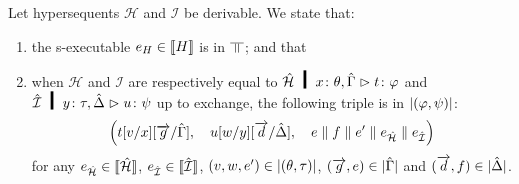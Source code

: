 \begin{theorem}[Adequacy]
 \label{c:adequacy}
 Let hypersequents $\mathcal H$ and $\mathcal I$ be derivable.
 We state that:
 \begin{enumerate}[label=(\arabic{*}), ref=\textit{(\arabic{*})}]
  \item \label{c:first} the s-executable
	$
	e_H\in\llbracket{H}\rrbracket
	$
	is in $\bbot$; and that
  \item \label{c:second}
	when $\mathcal H$ and $\mathcal I$ are respectively
	equal to $\hat{\mathcal H}\hmid\tj x\theta, \hat\G\tr \tj{t}\phi$
	and $\hat{\mathcal I}\hmid \tj y\tau, \hat\D\tr\tj u\psi$ up to
	exchange,
	the following triple is in $|{(\varphi,\psi)}|$:
	\[\left(
	t[v/x][\overrightarrow g/\hat {\Gamma}],\quad
	u[w/y][\overrightarrow d/\hat {\Delta}],\quad
	 e \parallel  f \parallel e' \parallel e_{\hat{\mathcal H}} \parallel
	e_{\hat{\mathcal I}}
	\right)
	\]
	for any
	$e_{\hat{\mathcal{H}}} \in \llbracket{\hat{\mathcal{H}}}\rrbracket$,
	$e_{\hat{\mathcal{I}}} \in \llbracket{\hat{\mathcal{I}}}\rrbracket$,
	$(v,w,e')\in|{(\theta,\tau)}|$,
	$(\overrightarrow g, e)\in|{\hat{\Gamma}}|$ and
	$(\overrightarrow d, f)\in|{\hat{\Delta}}|$.
  \end{enumerate}
\end{theorem}
